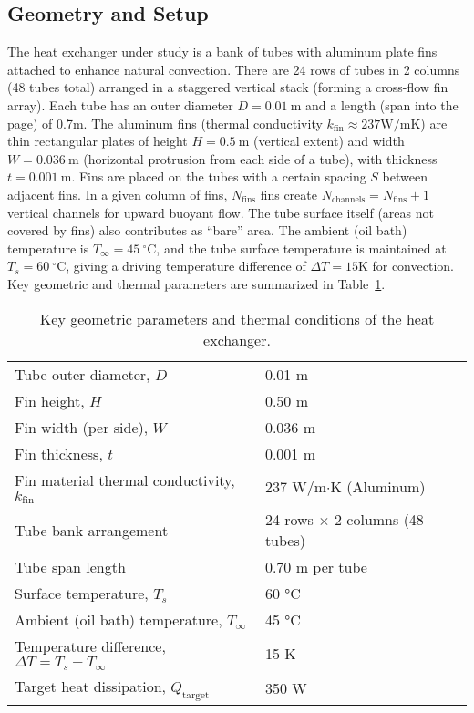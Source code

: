 \documentclass[12pt]{article}
\begin{document}
\subsection{Geometry and Setup}
The heat exchanger under study is a bank of tubes with aluminum plate fins attached to enhance natural convection. There are 24 rows of tubes in 2 columns (48 tubes total) arranged in a staggered vertical stack (forming a cross-flow fin array). Each tube has an outer diameter $D = 0.01~\text{m}$ and a length (span into the page) of 0.7m. The aluminum fins (thermal conductivity $k_{\text{fin}} \approx 237\text{W/mK}$) are thin rectangular plates of height $H = 0.5~\text{m}$ (vertical extent) and width $W = 0.036~\text{m}$ (horizontal protrusion from each side of a tube), with thickness $t = 0.001~\text{m}$. Fins are placed on the tubes with a certain spacing $S$ between adjacent fins. In a given column of fins, $N_{\text{fins}}$ fins create $N_{\text{channels}} = N_{\text{fins}} + 1$ vertical channels for upward buoyant flow. The tube surface itself (areas not covered by fins) also contributes as “bare” area. The ambient (oil bath) temperature is $T_\infty = 45~^\circ\text{C}$, and the tube surface temperature is maintained at $T_s = 60~^\circ\text{C}$, giving a driving temperature difference of $\Delta T = 15\text{K}$ for convection. Key geometric and thermal parameters are summarized in Table~\ref{tab:geom}.

\begin{table}[h!]
\centering
\caption{Key geometric parameters and thermal conditions of the heat exchanger.}
\label{tab:geom}
\begin{tabular}{ll}
\toprule
Tube outer diameter, $D$ & 0.01 m \\
Fin height, $H$ & 0.50 m \\
Fin width (per side), $W$ & 0.036 m \\
Fin thickness, $t$ & 0.001 m \\
Fin material thermal conductivity, $k_{\text{fin}}$ & 237 W/m$\cdot$K (Aluminum) \\
Tube bank arrangement & 24 rows $\times$ 2 columns (48 tubes) \\
Tube span length & 0.70 m per tube \\
Surface temperature, $T_s$ & 60 °C \\
Ambient (oil bath) temperature, $T_\infty$ & 45 °C \\
Temperature difference, $\Delta T = T_s - T_\infty$ & 15 K \\
Target heat dissipation, $Q_{\text{target}}$ & 350 W \\
\bottomrule
\end{tabular}
\end{table}
\end{document}
